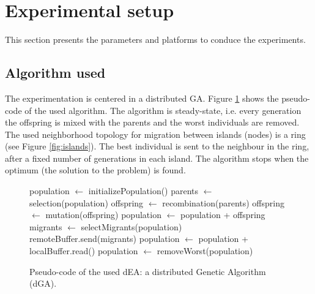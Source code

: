 \documentclass[final,1p,times]{elsarticle}
\begin{document}
\section{Experimental setup}
\label{sec:experiments}
This section presents the parameters and platforms to conduce the experiments. 



\subsection{Algorithm used}
The experimentation is centered in a distributed GA. Figure \ref{fig:EA} shows the pseudo-code of the used algorithm. %
The algorithm is steady-state, i.e. every generation the offspring is mixed with the parents and the worst individuals are removed. The used neighborhood topology for migration between islands (nodes) is a ring (see Figure \ref{fig:islands}). The best individual is sent to the neighbour in the ring, after a fixed number of generations in each island. The algorithm stops when the optimum (the solution to the problem) is found.  %



\begin{figure}[htb]

\begin{algorithmic}
\STATE population $\gets$ initializePopulation()
    \STATE parents $\gets$ selection(population)
    \STATE offspring $\gets$ recombination(parents)
    \STATE offspring $\gets$ mutation(offspring)
    \STATE population $\gets$ population + offspring
      \STATE migrants $\gets$ selectMigrants(population)
      \STATE remoteBuffer.send(migrants)
    \ENDIF
      \STATE population $\gets$ population + localBuffer.read()
    \ENDIF
    \STATE population $\gets$ removeWorst(population)
\ENDWHILE

\end{algorithmic}
\caption{Pseudo-code of the used dEA: a distributed Genetic Algorithm (dGA).}
\label{fig:EA}
\end{figure}
\end{document}
